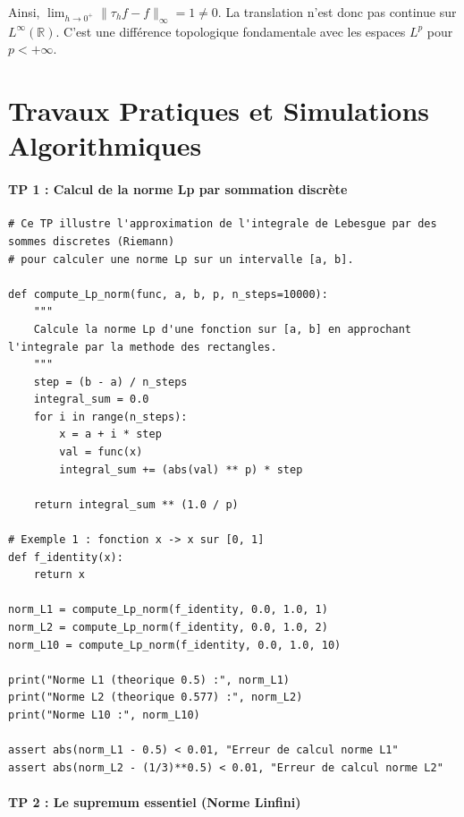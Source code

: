 \documentclass[11pt,a4paper]{article}
\begin{document}
Ainsi, $\lim_{h \to 0^+} \|\tau_h f - f\|_\infty = 1 \neq 0$.
La translation n'est donc pas continue sur $L^\infty(\mathbb{R})$. C'est une différence topologique fondamentale avec les espaces $L^p$ pour $p < +\infty$.


\part{Travaux Pratiques et Simulations Algorithmiques}
\subsection*{TP 1 : Calcul de la norme Lp par sommation discrète}

\begin{lstlisting}
# Ce TP illustre l'approximation de l'integrale de Lebesgue par des sommes discretes (Riemann)
# pour calculer une norme Lp sur un intervalle [a, b].

def compute_Lp_norm(func, a, b, p, n_steps=10000):
    """
    Calcule la norme Lp d'une fonction sur [a, b] en approchant l'integrale par la methode des rectangles.
    """
    step = (b - a) / n_steps
    integral_sum = 0.0
    for i in range(n_steps):
        x = a + i * step
        val = func(x)
        integral_sum += (abs(val) ** p) * step

    return integral_sum ** (1.0 / p)

# Exemple 1 : fonction x -> x sur [0, 1]
def f_identity(x):
    return x

norm_L1 = compute_Lp_norm(f_identity, 0.0, 1.0, 1)
norm_L2 = compute_Lp_norm(f_identity, 0.0, 1.0, 2)
norm_L10 = compute_Lp_norm(f_identity, 0.0, 1.0, 10)

print("Norme L1 (theorique 0.5) :", norm_L1)
print("Norme L2 (theorique 0.577) :", norm_L2)
print("Norme L10 :", norm_L10)

assert abs(norm_L1 - 0.5) < 0.01, "Erreur de calcul norme L1"
assert abs(norm_L2 - (1/3)**0.5) < 0.01, "Erreur de calcul norme L2"\end{lstlisting}


\subsection*{TP 2 : Le supremum essentiel (Norme Linfini)}
\end{document}
